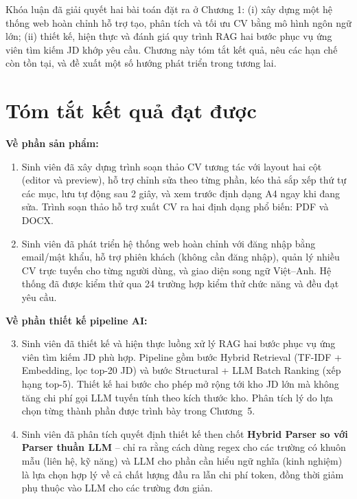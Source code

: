\documentclass[../DoAn.tex]{subfiles}
\begin{document}
Khóa luận đã giải quyết hai bài toán đặt ra ở Chương 1: (i) xây dựng một hệ thống web hoàn chỉnh hỗ trợ tạo, phân tích và tối ưu CV bằng mô hình ngôn ngữ lớn; (ii) thiết kế, hiện thực và đánh giá quy trình RAG hai bước phục vụ ứng viên tìm kiếm JD khớp yêu cầu. Chương này tóm tắt kết quả, nêu các hạn chế còn tồn tại, và đề xuất một số hướng phát triển trong tương lai.

\section{Tóm tắt kết quả đạt được}

\textbf{Về phần sản phẩm:}

\begin{enumerate}
\item Sinh viên đã xây dựng trình soạn thảo CV tương tác với layout hai cột (editor và preview), hỗ trợ chỉnh sửa theo từng phần, kéo thả sắp xếp thứ tự các mục, lưu tự động sau 2 giây, và xem trước định dạng A4 ngay khi đang sửa. Trình soạn thảo hỗ trợ xuất CV ra hai định dạng phổ biến: PDF và DOCX.

\item Sinh viên đã phát triển hệ thống web hoàn chỉnh với đăng nhập bằng email/mật khẩu, hỗ trợ phiên khách (không cần đăng nhập), quản lý nhiều CV trực tuyến cho từng người dùng, và giao diện song ngữ Việt--Anh. Hệ thống đã được kiểm thử qua 24 trường hợp kiểm thử chức năng và đều đạt yêu cầu.
\end{enumerate}

\textbf{Về phần thiết kế pipeline AI:}

\begin{enumerate}\setcounter{enumi}{2}
\item Sinh viên đã thiết kế và hiện thực luồng xử lý RAG hai bước phục vụ ứng viên tìm kiếm JD phù hợp. Pipeline gồm bước Hybrid Retrieval (TF-IDF + Embedding, lọc top-20 JD) và bước Structural + LLM Batch Ranking (xếp hạng top-5). Thiết kế hai bước cho phép mở rộng tới kho JD lớn mà không tăng chi phí gọi LLM tuyến tính theo kích thước kho. Phân tích lý do lựa chọn từng thành phần được trình bày trong Chương~5.

\item Sinh viên đã phân tích quyết định thiết kế then chốt \textbf{Hybrid Parser so với Parser thuần LLM} -- chỉ ra rằng cách dùng regex cho các trường có khuôn mẫu (liên hệ, kỹ năng) và LLM cho phần cần hiểu ngữ nghĩa (kinh nghiệm) là lựa chọn hợp lý về cả chất lượng đầu ra lẫn chi phí token, đồng thời giảm phụ thuộc vào LLM cho các trường đơn giản.
\end{enumerate}
\end{document}
